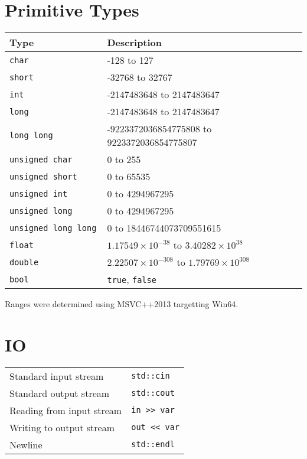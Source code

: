 \documentclass[oneside]{book}
\begin{document}
\begin{extra}
\tableofcontents
\end{extra}

\chapter{Primitive Types}
\begin{center}
  \begin{tabular}{ll}
    \textbf{Type} & \textbf{Description} \\
    \toprule
    \tt char & -128 to 127 \\
    \tt short & -32768 to 32767 \\
    \tt int & -2147483648 to 2147483647 \\
    \tt long & -2147483648 to 2147483647 \\
    \tt long long & -9223372036854775808 to 9223372036854775807 \\
    \midrule
    \tt unsigned char & 0 to 255 \\
    \tt unsigned short & 0 to 65535 \\
    \tt unsigned int & 0 to 4294967295 \\
    \tt unsigned long & 0 to 4294967295 \\
    \tt unsigned long long & 0 to 18446744073709551615 \\
    \midrule
    \tt float & $1.17549 \times 10^{-38}$ to $3.40282 \times 10^{38}$ \\
    \tt double & $2.22507 \times 10^{-308}$ to $1.79769 \times 10^{308}$ \\
    \midrule
    \tt bool & {\tt true}, {\tt false} \\
    \bottomrule
  \end{tabular}
\end{center}
Ranges were determined using MSVC++2013 targetting Win64.
\begin{extra}
\end{extra}


\chapter{IO}

\begin{center}
  \begin{tabular}{ll}
    Standard input stream & \lstinline{std::cin} \\
    Standard output stream & \lstinline{std::cout} \\
    Reading from input stream & \lstinline{in >> var} \\
    Writing to output stream & \lstinline{out << var} \\
    Newline & \lstinline{std::endl} \\
  \end{tabular}
\end{center}

\begin{example}
\end{example}

\begin{example}
\end{example}
\end{document}
